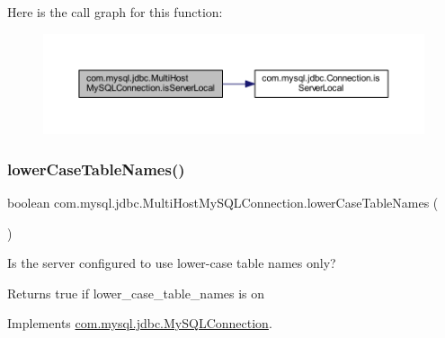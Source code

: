 Here is the call graph for this function\+:
\nopagebreak
\begin{figure}[H]
\begin{center}
\leavevmode
\includegraphics[width=350pt]{classcom_1_1mysql_1_1jdbc_1_1_multi_host_my_s_q_l_connection_a044d7bf7d1701e6102dfd2d0c88be318_cgraph}
\end{center}
\end{figure}
\mbox{\label{classcom_1_1mysql_1_1jdbc_1_1_multi_host_my_s_q_l_connection_a0d35ab03e1820d4895d11f35d7b9a9ac}} 
\subsubsection{\texorpdfstring{lower\+Case\+Table\+Names()}{lowerCaseTableNames()}}
{\footnotesize\ttfamily boolean com.\+mysql.\+jdbc.\+Multi\+Host\+My\+S\+Q\+L\+Connection.\+lower\+Case\+Table\+Names (\begin{DoxyParamCaption}{ }\end{DoxyParamCaption})}

Is the server configured to use lower-\/case table names only?

\begin{DoxyReturn}{Returns}
true if lower\+\_\+case\+\_\+table\+\_\+names is \textquotesingle{}on\textquotesingle{} 
\end{DoxyReturn}


Implements \mbox{\hyperlink{interfacecom_1_1mysql_1_1jdbc_1_1_my_s_q_l_connection_a5b25c6fb6c56e77ebc6989179da0dd75}{com.\+mysql.\+jdbc.\+My\+S\+Q\+L\+Connection}}.


